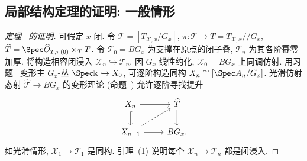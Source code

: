 \subsection{局部结构定理的证明: 一般情形}\label{src:7.7.5-subsection}
\begin{proof}[定理~ 的证明]
可假定 $x$ 闭. 令 $\mathcal T=[T_{\mathcal X,x}/G_x]$, $\pi:\mathcal T\to T=T_{\mathcal X,x}//G_x$, $\widehat{\mathcal T}=\Spec\widehat{\mathcal O}_{T,\pi(0)}\times_T\mathcal T$. 令 $\mathcal T_0=BG_x$ 为支撑在原点的闭子叠, $\mathcal T_n$ 为其各阶幂零加厚. 将构造相容闭浸入 $\mathcal X_n\hookrightarrow\mathcal T_n$. 因 $G_x$ 线性约化, $\mathcal X_0=BG_x$ 上同调仿射. 用习题~ 变形主 $G_x$-丛 $\Spec\Bbbk\hookrightarrow\mathcal X_0$, 可逐阶构造同构 $\mathcal X_n\cong[\Spec A_n/G_x]$. 光滑仿射态射 $\widehat{\mathcal T}\to BG_x$ 的变形理论 (命题~) 允许逐阶寻找提升
\begin{align*}
\begin{tikzcd}[ampersand replacement=\&]
\mathcal X_n\arrow[r]\arrow[d,hook]\&\widehat{\mathcal T}\arrow[d]\\
\mathcal X_{n+1}\arrow[r]\arrow[ur,dashed]\&BG_x.
\end{tikzcd}
\end{align*}
如光滑情形, $\mathcal X_1\to\mathcal T_1$ 是同构. 引理~(1) 说明每个 $\mathcal X_n\to\mathcal T_n$ 都是闭浸入.


\end{proof}
